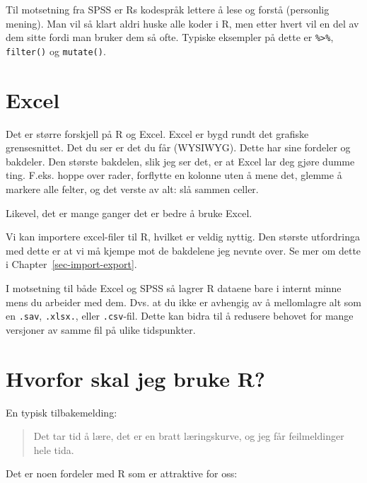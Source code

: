 \documentclass[
  letterpaper,
  DIV=11,
  numbers=noendperiod]{scrreprt}
\begin{document}
Til motsetning fra SPSS er Rs kodespråk lettere å lese og forstå
(personlig mening). Man vil så klart aldri huske alle koder i R, men
etter hvert vil en del av dem sitte fordi man bruker dem så ofte.
Typiske eksempler på dette er \texttt{\%\textgreater{}\%},
\texttt{filter()} og \texttt{mutate()}.

\hypertarget{excel}{%
\section{Excel}\label{excel}}

Det er større forskjell på R og Excel. Excel er bygd rundt det grafiske
grensesnittet. Det du ser er det du får (WYSIWYG). Dette har sine
fordeler og bakdeler. Den største bakdelen, slik jeg ser det, er at
Excel lar deg gjøre dumme ting. F.eks. hoppe over rader, forflytte en
kolonne uten å mene det, glemme å markere alle felter, og det verste av
alt: slå sammen celler.

Likevel, det er mange ganger det er bedre å bruke Excel.

Vi kan importere excel-filer til R, hvilket er veldig nyttig. Den
største utfordringa med dette er at vi må kjempe mot de bakdelene jeg
nevnte over. Se mer om dette i Chapter~\ref{sec-import-export}.

I motsetning til både Excel og SPSS så lagrer R dataene bare i internt
minne mens du arbeider med dem. Dvs. at du ikke er avhengig av å
mellomlagre alt som en \texttt{.sav}, \texttt{.xlsx.}, eller
\texttt{.csv}-fil. Dette kan bidra til å redusere behovet for mange
versjoner av samme fil på ulike tidspunkter.

\hypertarget{hvorfor-skal-jeg-bruke-r}{%
\section{Hvorfor skal jeg bruke R?}\label{hvorfor-skal-jeg-bruke-r}}

En typisk tilbakemelding:

\begin{quote}
Det tar tid å lære, det er en bratt læringskurve, og jeg får
feilmeldinger hele tida.
\end{quote}

Det er noen fordeler med R som er attraktive for oss:
\end{document}
